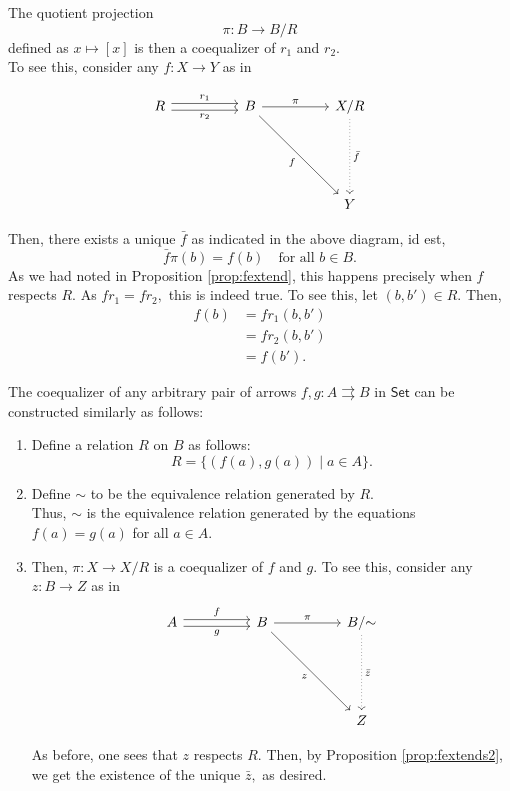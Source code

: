 \documentclass[11pt,leqno,landscape,semhelv]{seminar}
\theoremstyle{definition}
\numberwithin{joke}{section}
\numberwithin{thm}{section}
\numberwithin{equation}{section}
\newcommand{\tto}{\rightrightarrows}
\begin{document}
The quotient projection 
\begin{equation*} 
  \pi:B \to B/R
\end{equation*}
defined as $x \mapsto [x]$ is then a coequalizer of $r_1$ and $r_2.$\\
To see this, consider any $f:X \to Y$ as in

\begin{equation*} 
  \begin{tikzcd}
  R \arrow[rr, "r_1", shift left] \arrow[rr, "r_2"', shift right]&& 
  B \arrow[rr, "\pi"] \arrow[rrddd, "f"'] &  & X/R \arrow[ddd, "\bar{f}", dotted] \\&&&&\\&&&&\\
  &&&& Y  
  \end{tikzcd}
\end{equation*}

Then, there exists a unique $\bar{f}$ as indicated in the above diagram, id est, 
\begin{equation*}   
  \bar{f}\pi(b) = f(b) \quad \text{for all } b \in B.
\end{equation*}
As we had noted in Proposition \ref{prop:fextend}, this happens precisely when $f$ respects $R.$ As $fr_1 = fr_2,$ this is indeed true. To see this, let $(b, b') \in R.$ Then,
\begin{align*} 
  f(b) &= fr_1(b, b')\\
  &= fr_2(b, b')\\
  &= f(b').
\end{align*}

\exapmle{} The coequalizer of any arbitrary pair of arrows $f, g:A\tto B$ in $\mathsf{Set}$ can be constructed similarly as follows:
\begin{enumerate}
  \item Define a relation $R$ on $B$ as follows:
  \begin{equation*} 
    R = \{(f(a), g(a)) \mid a \in A\}.
  \end{equation*}
  \item Define $\sim$ to be the equivalence relation generated by $R.$\\
  Thus, $\sim$ is the equivalence relation generated by the equations $f(a) = g(a)$ for all $a \in A.$
  \item Then, $\pi:X \to X/R$ is a coequalizer of $f$ and $g.$ To see this, consider any $z:B \to Z$ as in
  \begin{equation*} 
    \begin{tikzcd}
    A \arrow[rr, "f", shift left] \arrow[rr, "g"', shift right] &  & B \arrow[rr, "\pi"] \arrow[rrddd, "z"'] &  & B/{\sim} \arrow[ddd, "\bar{z}", dotted] \\
    &&&&\\&&&&\\
    &&&& Z       
    \end{tikzcd}
  \end{equation*}

  As before, one sees that $z$ respects $R.$ Then, by Proposition \ref{prop:fextends2}, we get the existence of the unique $\bar{z},$ as desired.
\end{enumerate}
\end{document}
